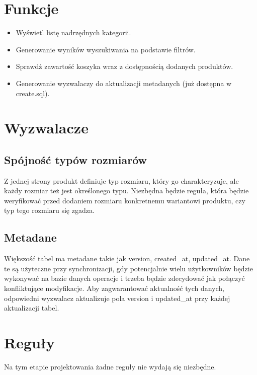 \section*{Funkcje}
\begin{itemize}
    \item Wyświetl listę nadrzędnych kategorii.
    \item Generowanie wyników wyszukiwania na podstawie filtrów.
    \item Sprawdź zawartość koszyka wraz z dostępnością dodanych produktów.
    \item Generowanie wyzwalaczy do aktualizacji metadanych (już dostępna w create.sql).
\end{itemize}

\section*{Wyzwalacze}
\subsection*{Spójność typów rozmiarów}
Z jednej strony produkt definiuje typ rozmiaru, który go charakteryzuje, ale każdy rozmiar też jest określonego typu. Niezbędna będzie reguła, która będzie weryfikować przed dodaniem rozmiaru konkretnemu wariantowi produktu, czy typ tego rozmiaru się zgadza.

\subsection*{Metadane}
Większość tabel ma metadane takie jak version, created\_at, updated\_at. Dane te są użyteczne przy synchronizacji, gdy potencjalnie wielu użytkowników będzie wykonywać na bazie danych operacje i trzeba będzie zdecydować jak połączyć konfliktujące modyfikacje. Aby zagwarantować aktualność tych danych, odpowiedni wyzwalacz aktualizuje pola version i updated\_at przy każdej aktualizacji tabel.

\section*{Reguły}
Na tym etapie projektowania żadne reguły nie wydają się niezbędne.



